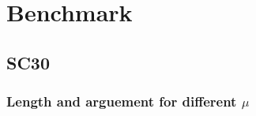 \documentclass[../main.tex]{subfiles}
\begin{document}
\section{Benchmark}
%         
%         
%         


\subsection{SC30}
\subsubsection{Length and arguement for different $\mu$}
\end{document}
